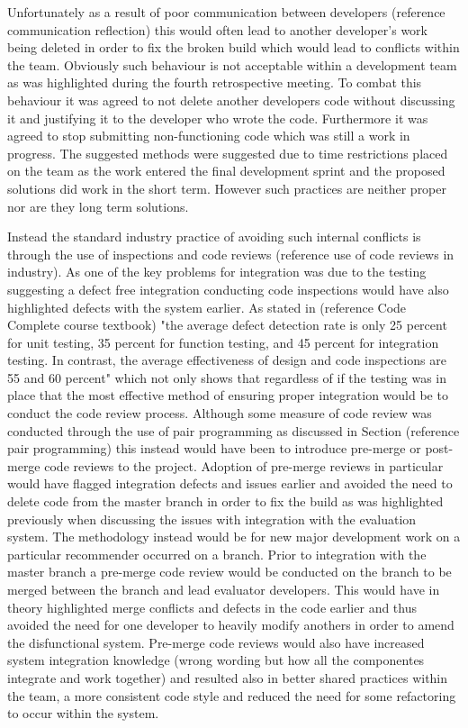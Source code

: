 \documentclass{l3proj}
\begin{document}
Unfortunately as a result of poor communication between developers (reference communication reflection) this would often lead to another developer's work being deleted in order to fix the broken build which would lead to conflicts within the team. Obviously such behaviour is not acceptable within a development team as was highlighted during the fourth retrospective meeting. To combat this behaviour it was agreed to not delete another developers code without discussing it and justifying it to the developer who wrote the code. Furthermore it was agreed to stop submitting non-functioning code which was still a work in progress. The suggested methods were suggested due to time restrictions placed on the team as the work entered the final development sprint and the proposed solutions did work in the short term. However such practices are neither proper nor are they long term solutions. 

Instead the standard industry practice of avoiding such internal conflicts is through the use of inspections and code reviews (reference use of code reviews in industry). As one of the key problems for integration was due to the testing suggesting a defect free integration conducting code inspections would have also highlighted defects with the system earlier. As stated in (reference Code Complete course textbook) "the average defect detection rate is only 25 percent for unit testing, 35 percent for function testing, and 45 percent for integration testing. In contrast, the average effectiveness of design and code inspections are 55 and 60 percent" which not only shows that regardless of if the testing was in place that the most effective method of ensuring proper integration would be to conduct the code review process. Although some measure of code review was conducted through the use of pair programming as discussed in Section (reference pair programming) this instead would have been to introduce pre-merge or post-merge code reviews to the project. Adoption of pre-merge reviews in particular would have flagged integration defects and issues earlier and avoided the need to delete code from the master branch in order to fix the build as was highlighted previously when discussing the issues with integration with the evaluation system. The methodology instead would be for new major development work on a particular recommender occurred on a branch. Prior to integration with the master branch a pre-merge code review would be conducted on the branch to be merged between the branch and lead evaluator developers. This would have in theory highlighted merge conflicts and defects in the code earlier and thus avoided the need for one developer to heavily modify anothers in order to amend the disfunctional system. Pre-merge code reviews would also have increased system integration knowledge (wrong wording but how all the componentes integrate and work together) and resulted also in better shared practices within the team, a more consistent code style and reduced the need for some refactoring to occur within the system. 
\end{document}
